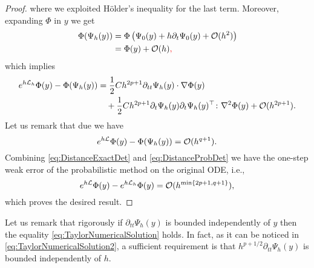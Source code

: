 \documentclass[10pt]{article}
\begin{document}
\begin{proof}
	where we exploited Hölder's inequality for the last term. Moreover, expanding $\Phi$ in $y$ we get
	\begin{equation}
		\begin{aligned}
			\Phi(\Psi_h(y)) &= \Phi\left(\Psi_0(y) + h\partial_t \Psi_0(y) + \mathcal{O}(h^2)\right) \\
			&= \Phi(y) + \mathcal{O}(h){\color{red},}
		\end{aligned}
	\end{equation}
	which implies
	\begin{equation}\label{eq:DistanceProbDet}
		\begin{aligned}
			e^{h\mathcal{L}_h}\Phi(y) - \Phi(\Psi_h(y)) &= \frac{1}{2} Ch^{2p+1}\partial_{tt}\Psi_h(y) \cdot \nabla\Phi(y)\\
			&\quad +\frac{1}{2}Ch^{2p+1}\partial_t \Psi_h(y) \partial_t \Psi_h(y)^\top  \colon \nabla^2\Phi(y) + \mathcal{O}(h^{2p+1}).
		\end{aligned}
	\end{equation}
	Let us remark that due  we have
	\begin{equation}\label{eq:DistanceExactDet}
		e^{h\mathcal{L}}\Phi(y) - \Phi(\Psi_h(y)) = \mathcal{O}(h^{q+1}).
	\end{equation}
	Combining \eqref{eq:DistanceExactDet} and \eqref{eq:DistanceProbDet} we have the one-step weak error of the probabilistic method on the original ODE, i.e., 
	\begin{equation}\label{eq:LocalWeakError}
		e^{h\mathcal{L}}\Phi(y) - e^{h\mathcal{L}_h}\Phi(y) = \mathcal{O}(h^{\min\{2p+1, q+1\}}),
	\end{equation}
	which proves the desired result.
\end{proof}

\begin{remark} Let us remark that rigorously if $\partial_{tt}\Psi_h(y)$ is bounded independently of $y$ then the equality \eqref{eq:TaylorNumericalSolution} holds. In fact, as it can be noticed in \eqref{eq:TaylorNumericalSolution2}, a sufficient requirement is that $h^{p+1/2}\partial_{tt}\Psi_h(y)$ is bounded independently of $h$. 
\end{remark}
\end{document}
